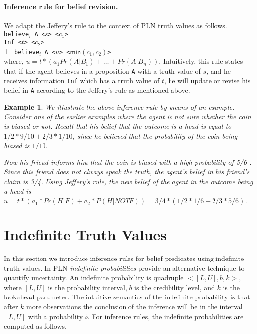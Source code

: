 \documentclass[12pt]{article}
\newtheorem{example}[theorem]{Example}
\begin{document}
\paragraph{Inference rule for belief revision.} We adapt the Jeffery's rule \cite{Jeffrey1983} to the context of PLN truth values as follows.\\

\noindent \texttt{believe$_i$ A <$s$> <$c_1$>}\\
\noindent \texttt{Inf <$t$> <$c_2$>}\\
$\vdash$
\noindent \texttt{believe$_i$ A <$u$> <$\mathsf{min} (c_1,c_2)$>}\\

where, $u=t*(a_1 Pr(A|B_1) + \ldots + Pr(A|B_n))$. Intuitively, this rule states that if the agent believes in a proposition \texttt{A} with a truth value of $s$, and he receives information \texttt{Inf} which has a truth value of $t$, he will update or revise his belief in \texttt{A} according to the Jeffery's rule as mentioned above. 

\begin{example}{\em We illustrate the above inference rule by means of an example. Consider one of the earlier examples where the agent is not sure whether the coin is biased or not. Recall that his belief that the outcome is a head is equal to $1/2*9/10 + 2/3*1/10$, since he believed that the probability of the coin being biased is $1/10$.

 Now his friend informs him that the coin is biased with a high probability of 5/6 . Since this friend does not always speak the truth, the agent's belief in his friend's claim is 3/4. Using Jeffery's rule, the new belief of the agent in the outcome being a head is $u= t* (a_1*Pr(H|F)+a_2*P(H| NOT F)) = 3/4 * (1/2*1/6 + 2/3*5/6) $.
}
\end{example}

\section{Indefinite Truth Values} In this section we introduce inference rules for belief predicates using  indefinite truth values. In PLN \emph{indefinite probabilities} provide an alternative technique to quantify  uncertainty. An indefinite probability is quadruple $<[L,U],b,k>$, where $[L,U]$ is the probability interval,  $b$ is the  credibility level, and $k$ is the lookahead parameter. The intuitive semantics of the indefinite probability is that after $k$ more observations the conclusion of the inference will be in the interval $[L,U]$ with a probability $b$. For inference rules, the indefinite probabilities are computed as follows.
\end{document}

